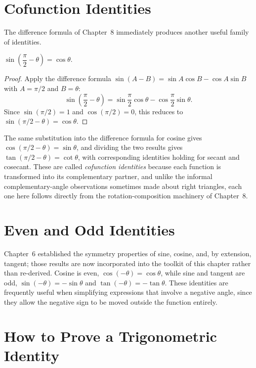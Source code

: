 \section{Cofunction Identities}

The difference formula of Chapter~8 immediately produces another useful
family of identities.

\begin{theorem}
$\sin\left(\dfrac{\pi}{2} - \theta\right) = \cos\theta$.
\end{theorem}

\begin{proof}
Apply the difference formula $\sin(A-B) = \sin A\cos B - \cos A\sin B$ with
$A = \pi/2$ and $B = \theta$:
\[
\sin\left(\frac{\pi}{2}-\theta\right) = \sin\frac{\pi}{2}\cos\theta -
\cos\frac{\pi}{2}\sin\theta.
\]
Since $\sin(\pi/2) = 1$ and $\cos(\pi/2) = 0$, this reduces to
$\sin\left(\pi/2 - \theta\right) = \cos\theta$.
\end{proof}

The same substitution into the difference formula for cosine gives
$\cos\left(\pi/2 - \theta\right) = \sin\theta$, and dividing the two
results gives $\tan\left(\pi/2 - \theta\right) = \cot\theta$, with
corresponding identities holding for secant and cosecant. These are called
\emph{cofunction identities} because each function is transformed into its
complementary partner, and unlike the informal complementary-angle
observations sometimes made about right triangles, each one here follows
directly from the rotation-composition machinery of Chapter~8.

\section{Even and Odd Identities}

Chapter~6 established the symmetry properties of sine, cosine, and, by
extension, tangent; those results are now incorporated into the toolkit of
this chapter rather than re-derived. Cosine is even, $\cos(-\theta) =
\cos\theta$, while sine and tangent are odd, $\sin(-\theta) = -\sin\theta$
and $\tan(-\theta) = -\tan\theta$. These identities are frequently useful
when simplifying expressions that involve a negative angle, since they
allow the negative sign to be moved outside the function entirely.

\section{How to Prove a Trigonometric Identity}

